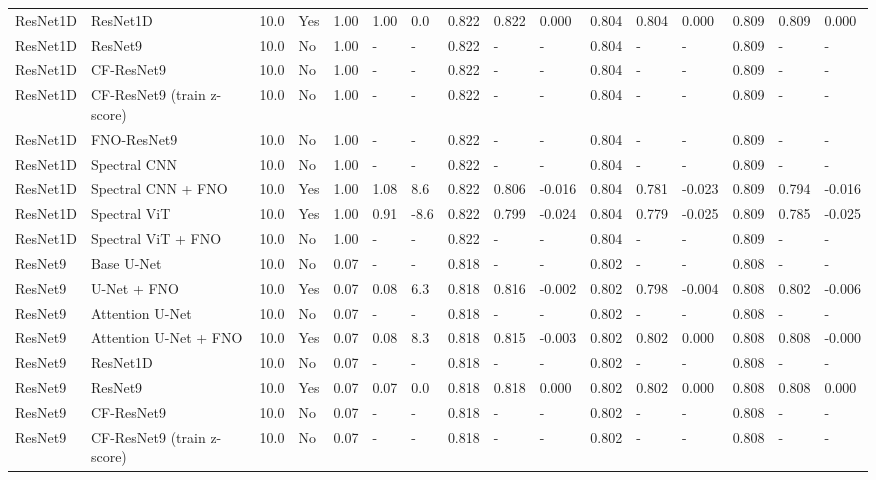 \begin{longtable}{llllllllllllllll}
ResNet1D & ResNet1D & 10.0 & Yes & 1.00 & 1.00 & 0.0 & 0.822 & 0.822 & 0.000 & 0.804 & 0.804 & 0.000 & 0.809 & 0.809 & 0.000 \\
ResNet1D & ResNet9 & 10.0 & No & 1.00 & - & - & 0.822 & - & - & 0.804 & - & - & 0.809 & - & - \\
ResNet1D & CF-ResNet9 & 10.0 & No & 1.00 & - & - & 0.822 & - & - & 0.804 & - & - & 0.809 & - & - \\
ResNet1D & CF-ResNet9 (train z-score) & 10.0 & No & 1.00 & - & - & 0.822 & - & - & 0.804 & - & - & 0.809 & - & - \\
ResNet1D & FNO-ResNet9 & 10.0 & No & 1.00 & - & - & 0.822 & - & - & 0.804 & - & - & 0.809 & - & - \\
ResNet1D & Spectral CNN & 10.0 & No & 1.00 & - & - & 0.822 & - & - & 0.804 & - & - & 0.809 & - & - \\
ResNet1D & Spectral CNN + FNO & 10.0 & Yes & 1.00 & 1.08 & 8.6 & 0.822 & 0.806 & -0.016 & 0.804 & 0.781 & -0.023 & 0.809 & 0.794 & -0.016 \\
ResNet1D & Spectral ViT & 10.0 & Yes & 1.00 & 0.91 & -8.6 & 0.822 & 0.799 & -0.024 & 0.804 & 0.779 & -0.025 & 0.809 & 0.785 & -0.025 \\
ResNet1D & Spectral ViT + FNO & 10.0 & No & 1.00 & - & - & 0.822 & - & - & 0.804 & - & - & 0.809 & - & - \\
ResNet9 & Base U-Net & 10.0 & No & 0.07 & - & - & 0.818 & - & - & 0.802 & - & - & 0.808 & - & - \\
ResNet9 & U-Net + FNO & 10.0 & Yes & 0.07 & 0.08 & 6.3 & 0.818 & 0.816 & -0.002 & 0.802 & 0.798 & -0.004 & 0.808 & 0.802 & -0.006 \\
ResNet9 & Attention U-Net & 10.0 & No & 0.07 & - & - & 0.818 & - & - & 0.802 & - & - & 0.808 & - & - \\
ResNet9 & Attention U-Net + FNO & 10.0 & Yes & 0.07 & 0.08 & 8.3 & 0.818 & 0.815 & -0.003 & 0.802 & 0.802 & 0.000 & 0.808 & 0.808 & -0.000 \\
ResNet9 & ResNet1D & 10.0 & No & 0.07 & - & - & 0.818 & - & - & 0.802 & - & - & 0.808 & - & - \\
ResNet9 & ResNet9 & 10.0 & Yes & 0.07 & 0.07 & 0.0 & 0.818 & 0.818 & 0.000 & 0.802 & 0.802 & 0.000 & 0.808 & 0.808 & 0.000 \\
ResNet9 & CF-ResNet9 & 10.0 & No & 0.07 & - & - & 0.818 & - & - & 0.802 & - & - & 0.808 & - & - \\
ResNet9 & CF-ResNet9 (train z-score) & 10.0 & No & 0.07 & - & - & 0.818 & - & - & 0.802 & - & - & 0.808 & - & - \\

\end{longtable}
